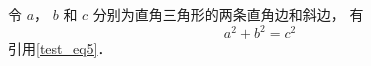 
令 $a$， $b$ 和 $c$ 分别为直角三角形的两条直角边和斜边， 有
\begin{equation}\label{test_eq5}
a^2 + b^2 = c^2
\end{equation}
引用\autoref{test_eq5}．
